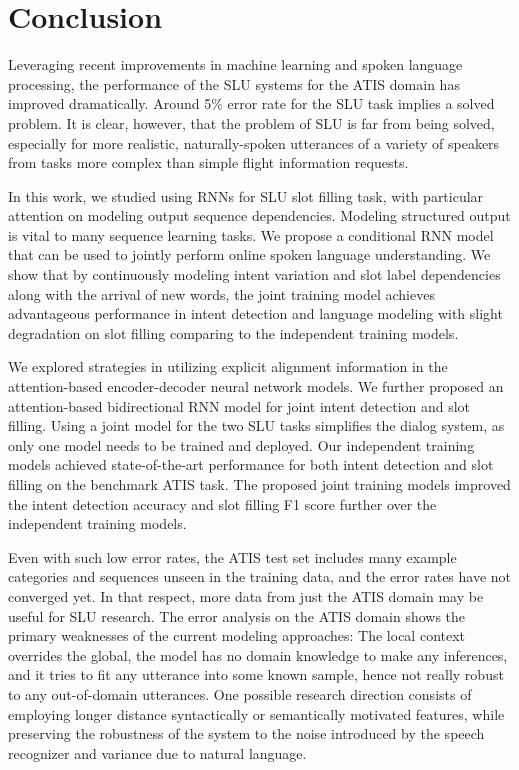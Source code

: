 \chapter{Conclusion}
Leveraging recent improvements in machine learning and spoken
language processing, the performance of the SLU systems for the
ATIS domain has improved dramatically. Around 5\% error rate for
the SLU task implies a solved problem. It is clear, however, that the
problem of SLU is far from being solved, especially for more realistic,
naturally-spoken utterances of a variety of speakers from tasks
more complex than simple flight information requests.
\par
In this work, we studied using RNNs for SLU slot filling task, with particular attention on modeling
output sequence dependencies. Modeling structured output is vital to many sequence learning tasks. We propose a conditional RNN
model that can be used to jointly perform online spoken language understanding. We show that by continuously modeling
intent variation and slot label dependencies along with the arrival of new words, the joint training model achieves advantageous performance in
intent detection and language modeling with slight degradation on slot filling comparing to the independent training models.
\par
We explored strategies in utilizing explicit alignment
information in the attention-based encoder-decoder neural
network models. We further proposed an attention-based bidirectional
RNN model for joint intent detection and slot filling.
Using a joint model for the two SLU tasks simplifies the dialog
system, as only one model needs to be trained and deployed.
Our independent training models achieved state-of-the-art performance
for both intent detection and slot filling on the benchmark
ATIS task. The proposed joint training models improved
the intent detection accuracy and slot filling F1 score further
over the independent training models.
\par
Even with such low error rates, the ATIS test set includes many
example categories and sequences unseen in the training data, and
the error rates have not converged yet. In that respect, more data
from just the ATIS domain may be useful for SLU research.
The error analysis on the ATIS domain shows the primary weaknesses
of the current modeling approaches: The local
context overrides the global, the model has no domain knowledge
to make any inferences, and it tries to fit any utterance into some
known sample, hence not really robust to any out-of-domain utterances.
One possible research direction consists of employing longer distance syntactically or semantically
motivated features, while preserving the robustness of the system to the noise introduced by the speech recognizer and variance due to natural language.